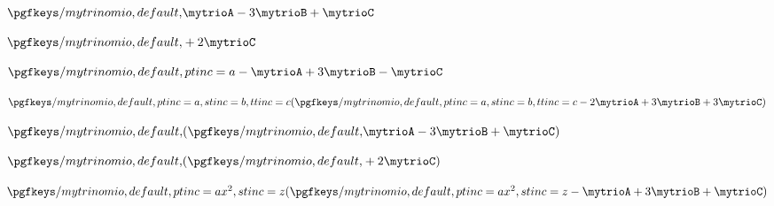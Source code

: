 \documentclass{article}
\begin{document}


$\ptrinomio{1}{-3}{1}$

$\ptrinomio{0}{0}{2}$

$\ptrinomio[ptinc=a]{-1}{3}{-1}$

$\ptrinomiop[ptinc=a, stinc=b,ttinc=c]{-2}{3}{3}$


$\ptrinomiop{1}{-3}{1}$

$\ptrinomiop{0}{0}{2}$

$\ptrinomiop[ptinc=ax^2, stinc=z]{-1}{3}{1}$
\end{document}

